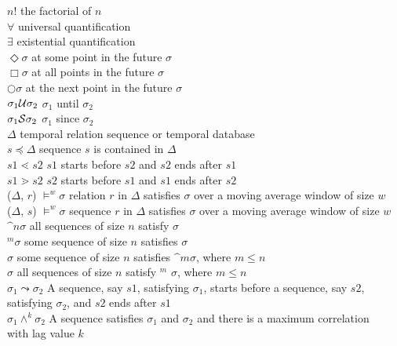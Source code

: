 \begin{symbolindex}
{\begin{tabbing}
 $n!$ \>		the factorial of $n$  \\
 $\forall$ \>		universal quantification  \\
 $\exists$ \>		existential quantification  \\
$\Diamond \sigma$ \>	at some point in the future $\sigma$ \\	
$\Box \sigma$ \>	at all points in the future $\sigma$ \\	
$\bigcirc \sigma$ \>	at the next point in the future $\sigma$ \\	
$\sigma_1 {\cal U} \sigma_2$ \>	$\sigma_1$  until  $\sigma_2$ \\	
$\sigma_1 {\cal S} \sigma_2$ \>	$\sigma_1$  since  $\sigma_2$ \\	
$\Delta$ \>		temporal relation sequence or temporal database \\
$s \preceq \Delta$  \>	sequence $s$ is contained in $\Delta$	\\
$s1 \lessdot s2$  \>	$s1$ starts before $s2$ and $s2$ ends after $s1$  \\
$s1 \gtrdot s2$  \>	$s2$ starts before $s1$ and $s1$ ends after $s2$ \\
($\Delta$, $r$) $\models^w \sigma$ \>	relation $r$ in 
$\Delta$ satisfies $\sigma$ over a moving average window of size $w$	\\
($\Delta$, $s$) $\models^w \sigma$ \>	sequence $r$ in
$\Delta$ satisfies $\sigma$ over a moving average window of size $w$	\\
$\bm^n \sigma$\>	all sequences of size $n$ satisfy $\sigma$  \\
\diam$^m \sigma$ \>	some sequence of size $n$ satisfies $\sigma$ \\
 $\sigma$  \>	some sequence of size $n$ satisfies
$\bm^m$$\sigma$, where $m \le n$ \\
 $\sigma$ \>		all sequences of size $n$ satisfy
\diam$^m$ $\sigma$,
where $m \le n$ \\
$\sigma_1 \leadsto \sigma_2 $ \>  A sequence, say $s1$, satisfying $\sigma_1$,
starts before a sequence, say $s2$,  \\
\>			satisfying $\sigma_2$, and $s2$ ends after $s1$ \\
$\sigma_1 \wedge^k \sigma_2$  \> A sequence satisfies $\sigma_1$ and
$\sigma_2$ and there is a maximum correlation \\
	\>		with lag value $k$  \\


\end{tabbing}

}


\end{symbolindex}

